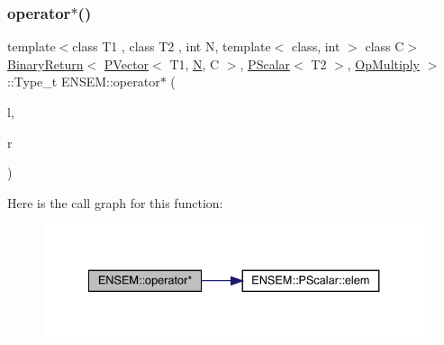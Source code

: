 \subsubsection{\texorpdfstring{operator$\ast$()}{operator*()}\hspace{0.1cm}{\footnotesize\ttfamily [1/3]}}
{\footnotesize\ttfamily template$<$class T1 , class T2 , int N, template$<$ class, int $>$ class C$>$ \\
\mbox{\hyperlink{structENSEM_1_1BinaryReturn}{Binary\+Return}}$<$ \mbox{\hyperlink{classENSEM_1_1PVector}{P\+Vector}}$<$ T1, \mbox{\hyperlink{operator__name__util_8cc_a7722c8ecbb62d99aee7ce68b1752f337}{N}}, C $>$, \mbox{\hyperlink{classENSEM_1_1PScalar}{P\+Scalar}}$<$ T2 $>$, \mbox{\hyperlink{structENSEM_1_1OpMultiply}{Op\+Multiply}} $>$\+::Type\+\_\+t E\+N\+S\+E\+M\+::operator$\ast$ (\begin{DoxyParamCaption}\item[{const \mbox{\hyperlink{classENSEM_1_1PVector}{P\+Vector}}$<$ T1, \mbox{\hyperlink{operator__name__util_8cc_a7722c8ecbb62d99aee7ce68b1752f337}{N}}, C $>$ \&}]{l,  }\item[{const \mbox{\hyperlink{classENSEM_1_1PScalar}{P\+Scalar}}$<$ T2 $>$ \&}]{r }\end{DoxyParamCaption})\hspace{0.3cm}{\ttfamily [inline]}}

Here is the call graph for this function\+:\nopagebreak
\begin{figure}[H]
\begin{center}
\leavevmode
\includegraphics[width=334pt]{d3/dc4/group__primvector_ga345fa1d5e68f5801446f6ff69feb2121_cgraph}
\end{center}
\end{figure}
\mbox{\label{group__primvector_ga8312ce5cc507ffa0b4b203b976d05f47}} 
